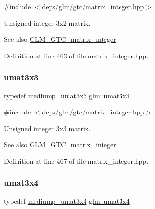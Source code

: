 {\ttfamily \#include $<$\hyperlink{matrix__integer_8hpp}{deps/glm/gtc/matrix\+\_\+integer.\+hpp}$>$}

Unsigned integer 3x2 matrix. \begin{DoxySeeAlso}{See also}
\hyperlink{group__gtc__matrix__integer}{G\+L\+M\+\_\+\+G\+T\+C\+\_\+matrix\+\_\+integer} 
\end{DoxySeeAlso}


Definition at line 463 of file matrix\+\_\+integer.\+hpp.

\mbox{\label{group__gtc__matrix__integer_gab80b6501ba1b2c40119a0f2d256f4c97}} 
\subsubsection{\texorpdfstring{umat3x3}{umat3x3}}
{\footnotesize\ttfamily typedef \hyperlink{group__gtc__matrix__integer_gac2563a9d45e3f6be0ceaf62b50a983f5}{mediump\+\_\+umat3x3} \hyperlink{group__gtc__matrix__integer_gab80b6501ba1b2c40119a0f2d256f4c97}{glm\+::umat3x3}}



{\ttfamily \#include $<$\hyperlink{matrix__integer_8hpp}{deps/glm/gtc/matrix\+\_\+integer.\+hpp}$>$}

Unsigned integer 3x3 matrix. \begin{DoxySeeAlso}{See also}
\hyperlink{group__gtc__matrix__integer}{G\+L\+M\+\_\+\+G\+T\+C\+\_\+matrix\+\_\+integer} 
\end{DoxySeeAlso}


Definition at line 467 of file matrix\+\_\+integer.\+hpp.

\mbox{\label{group__gtc__matrix__integer_ga5410857d098a989a30b4017100bc2ff7}} 
\subsubsection{\texorpdfstring{umat3x4}{umat3x4}}
{\footnotesize\ttfamily typedef \hyperlink{group__gtc__matrix__integer_ga22e32b4dcd60655044ebbd30f50a2e67}{mediump\+\_\+umat3x4} \hyperlink{group__gtc__matrix__integer_ga5410857d098a989a30b4017100bc2ff7}{glm\+::umat3x4}}



